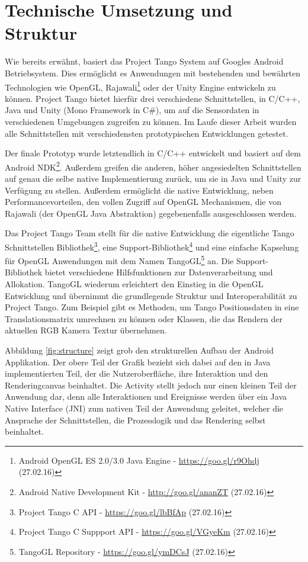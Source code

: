 \section{Technische Umsetzung und Struktur} \label{eq:technic}

Wie bereits erwähnt, basiert das Project Tango System auf Googles Android Betriebsystem. Dies ermöglicht es Anwendungen mit bestehenden und bewährten Technologien wie OpenGL, Rajawali\footnote{Android OpenGL ES 2.0/3.0 Java Engine - \url{https://goo.gl/r9Ohdj} (27.02.16)} oder der Unity Engine entwickeln zu können. Project Tango bietet hierfür drei verschiedene Schnittstellen, in C/C++, Java und Unity (Mono Framework in C\#), um auf die Sensordaten in verschiedenen Umgebungen zugreifen zu können. Im Laufe dieser Arbeit wurden alle Schnittstellen mit verschiedensten prototypischen Entwicklungen getestet.

Der finale Prototyp wurde letztendlich in C/C++ entwickelt und basiert auf dem Android NDK\footnote{Android Native Development Kit - \url{http://goo.gl/ananZT} (27.02.16)}. Außerdem greifen die anderen, höher angesiedelten Schnittstellen auf genau die selbe native Implementierung zurück, um sie in Java und Unity zur Verfügung zu stellen. Außerdem ermöglicht die native Entwicklung, neben Performancevorteilen, den vollen Zugriff auf OpenGL Mechanismen, die von Rajawali (der OpenGL Java Abstraktion) gegebenenfalls ausgeschlossen werden. 

Das Project Tango Team stellt für die native Entwicklung die eigentliche Tango Schnittstellen Bibliothek\footnote{Project Tango C API - \url{https://goo.gl/lbBfAp} (27.02.16)}, eine Support-Bibliothek\footnote{Project Tango C Suppport API - \url{https://goo.gl/VGyeKm} (27.02.16)} und eine einfache Kapselung für OpenGL Anwendungen mit dem Namen TangoGL\footnote{TangoGL Repository - \url{https://goo.gl/ymDCsJ} (27.02.16)} an. Die Support-Bibliothek bietet verschiedene Hilfsfunktionen zur Datenverarbeitung und Allokation. TangoGL wiederum erleichtert den Einstieg in die OpenGL Entwicklung und übernimmt die grundlegende Struktur und Interoperabilität zu Project Tango. Zum Beispiel gibt es Methoden, um Tango Positionsdaten in eine Translationsmatrix umrechnen zu können oder Klassen, die das Rendern der aktuellen RGB Kamera Textur übernehmen. 

Abbildung \ref{fig:structure} zeigt grob den strukturellen Aufbau der Android Applikation. Der obere Teil der Grafik bezieht sich dabei auf den in Java implementierten Teil, der die Nutzeroberfläche, ihre Interaktion und den Renderingcanvas beinhaltet. Die Activity stellt jedoch nur einen kleinen Teil der Anwendung dar, denn alle Interaktionen und Ereignisse werden über ein Java Native Interface (JNI) zum nativen Teil der Anwendung geleitet, welcher die Ansprache der Schnittstellen, die Prozesslogik und das Rendering selbst beinhaltet. 

